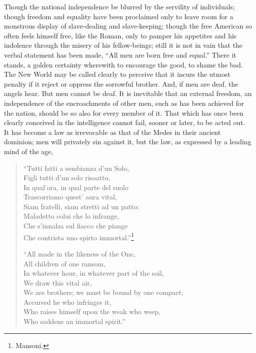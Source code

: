Though the national independence be blurred by the servility of
individuals; though freedom and equality have been proclaimed only to
leave room for a monstrous display of slave-dealing and slave-keeping;
though the  free American so often feels himself free, like
the Roman, only to pamper his appetites and his indolence through the
misery of his fellow-beings; still it is not in vain that the verbal
statement has been made, ``All men are born free and equal.'' There it
stands, a golden certainty wherewith to encourage the good, to shame
the bad. The New World may be called clearly to perceive that it
incurs the utmost penalty if it reject or oppress the sorrowful
brother. And, if men are deaf, the angels hear. But men cannot be
deaf. It is inevitable that an external freedom, an independence of
the encroachments of other men, such as has been achieved for the
nation, should be so also for every member of it. That which has once
been clearly conceived in the intelligence cannot fail, sooner or
later, to be acted out. It has become a law as irrevocable as that of
the Medes in their ancient dominion; men will privately sin against
it, but the law, as expressed by a leading mind of the age,

\begin{verse}
``Tutti fatti a sembianza d'un Solo,\\
Figli tutti d'un solo risoatto,\\
In qual'ora, in qual parte del suolo\\
Trascorriamo quest' aura vital,\\
Siam fratelli, siam stretti ad un patto:\\
Maladetto colui che lo infrange,\\
Che s'innalza sul fiacco che piange\\
Che contrista uno spirto immortal.''\footnote{Mansoni.}

``All made in the likeness of the One,\\
\hspace{1.1em} All children of one ransom,\\
In whatever hour, in whatever part of the soil,\\
\hspace{1.1em} We draw this vital air,\\
We are brothers; we must be bound by one compact;\\
\hspace{1.1em} Accursed he who infringes it,\\
Who raises himself upon the weak who weep,\\
\hspace{1.1em} Who saddens an immortal spirit.''
\end{verse}

